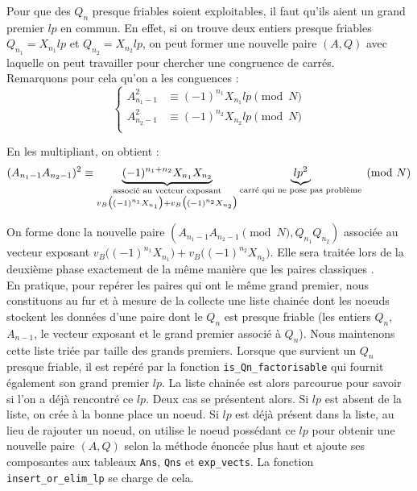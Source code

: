 Pour que des $Q_n$ presque friables soient exploitables, il faut qu'ils aient
un grand premier $lp$ en commun. En effet, si on trouve deux entiers presque
friables $Q_{n_1} = X_{n_1}lp $ et $Q_{n_2} =  X_{n_2}lp $, on peut former une
nouvelle paire $(A,Q)$ avec laquelle on peut travailler pour chercher une 
congruence de carrés. \\ 

Remarquons pour cela qu'on a les conguences :
\begin{equation*}
  \left\{
      \begin{aligned}
          A_{n_1 -1}^2 &\equiv (-1)^{n_1} X_{n_1}lp\pmod{N} \\
          A_{n_2 -1}^2 &\equiv (-1)^{n_2} X_{n_2}lp\pmod{N}\\
        \end{aligned}
    \right.
\end{equation*}

En les multipliant, on obtient : 
\[  (A_{n_1 -1} A_{n_2 -1})^2 \equiv 
     \underbrace{(-1)^{n_1 + n_2} X_{n_1} X_{n_2}}_
            {\begin{subarray}{c}\text{associé au vecteur exposant}\\
             v_{B} \big( (-1 )^{n_1} X_{n_1} \big)
             + v_{B} \big( (-1 )^{n_2} X_{n_2} \big) \end{subarray}
             }
    \underbrace{lp^2}_{\text{carré qui ne pose pas problème}}
    \pmod{N}
 \]
  
On forme donc la nouvelle paire $ (A_{n_1-1}A_{n_2 -1} \pmod{N}, Q_{n_1}Q_{n_2}) $
associée au vecteur exposant $v_{B} \big( (-1 )^{n_1} X_{n_1} \big)+
v_{B} \big( (-1 )^{n_2} X_{n_2} \big) $.  Elle sera traitée lors de la 
deuxième phase exactement de la même manière que les paires \og classiques \fg{}.\\

En pratique, pour repérer les paires qui ont le même grand premier, nous
constituons au fur et à mesure de la collecte une liste chainée dont les noeuds
stockent les données d'une paire dont le $Q_n$ est presque friable (les entiers
$Q_n$, $A_{n-1}$, le vecteur exposant et le grand premier associé à $Q_n$). Nous
maintenons cette liste triée par taille des grands premiers. Lorsque que survient
un $Q_n$ presque friable, il est repéré par la fonction
\texttt{is\_Qn\_factorisable} qui fournit également son grand premier $lp$. La 
liste chainée est alors parcourue pour savoir si l'on a déjà rencontré ce $lp$.
Deux cas se présentent alors. Si $lp$ est absent de la liste, on crée à la bonne
place un noeud. Si $lp$ est déjà présent dans la liste, au lieu de rajouter un
noeud, on utilise le noeud possédant ce $lp$ pour obtenir une nouvelle paire
$(A,Q)$ selon la méthode énoncée plus haut et ajoute ses composantes aux tableaux
\texttt{Ans}, \texttt{Qns} et \texttt{exp\_vects}. La fonction
\texttt{insert\_or\_elim\_lp} se charge de cela. \\

